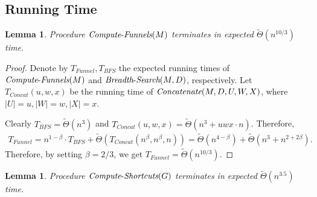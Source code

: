 \documentclass[11pt]{article}
\newtheorem{lemma}[theorem]{Lemma}
\newcommand{\Concat}{\mbox{{\it Concatenate}}}
\newcommand{\BFS}{\mbox{{\it Breadth}-{\it Search}}}
\newcommand{\ComputeF}{\mbox{{\it Compute}-{\it Funnels}}}
\newcommand{\ComputeS}{\mbox{{\it Compute}-{\it Shortcuts}}}
\begin{document}
\subsection{Running Time}

\begin{lemma}\label{running-time-funnels}
    Procedure $\ComputeF(M)$ terminates in expected $\tilde{\Theta}(n^{10/3})$ time.
\end{lemma}

\begin{proof}
     Denote by $T_{Funnel}, T_{BFS}$ the expected running times of $\ComputeF(M)$ and $\BFS(M,D)$, respectively. 
     Let $T_{Concat}(u,w,x)$ be the running time of $\Concat(M,D,U,W,X)$, where $|U|=u, |W|=w, |X|=x$.
    
    Clearly $T_{BFS} = \tilde{\Theta}(n^{3})$ and $T_{Concat}(u,w,x) = \tilde{\Theta}(n^3 + uwx\cdot n)$. Therefore, 
    \begin{align*}
        T_{Funnel} = n^{1-\beta}\cdot T_{BFS} + \tilde{\Theta}\left(T_{Concat}\left( n^{\beta}, n^{\beta}, n \right)\right) = \tilde{\Theta}(n^{4-\beta}) + \tilde{\Theta}(n^3 + n^{2+2\beta}).
    \end{align*}
    Therefore, by setting $\beta = 2/3$, we get $T_{Funnel} = \tilde{\Theta}(n^{10/3})$.
\end{proof}

\begin{lemma}
    Procedure $\ComputeS(G)$ terminates in expected $\tilde{\Theta}(n^{3.5})$ time.
\end{lemma}
\end{document}
